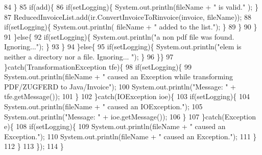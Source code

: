 \begin{DoxyCode}
84                             \}
85                             \textcolor{keywordflow}{if}(add)\{
86                                 \textcolor{keywordflow}{if}(setLogging)\{ System.out.println(fileName + \textcolor{stringliteral}{" is valid."} ); \}
87                                 ReducedInvoiceList.add(ir.ConvertInvoiceToRinvoice(invoice, fileName));
88                                 \textcolor{keywordflow}{if}(setLogging)\{ System.out.println( fileName + \textcolor{stringliteral}{" added to the list."}); \}
89                             \}
90                         \}
91                     \}\textcolor{keywordflow}{else}\{
92                         \textcolor{keywordflow}{if}(setLogging)\{ System.out.println(\textcolor{stringliteral}{"a non pdf file was found. Ignoring..."}); \}
93                     \}
94                 \}\textcolor{keywordflow}{else}\{
95                     \textcolor{keywordflow}{if}(setLogging)\{ System.out.println(\textcolor{stringliteral}{"elem is neither a directory nor a file. Ignoring...
      "}); \}
96                 \}\}
97             \}\textcolor{keywordflow}{catch}(TransformationException tfe)\{
98                 \textcolor{keywordflow}{if}(setLogging)\{ 
99                     System.out.println(fileName + \textcolor{stringliteral}{" caused an Exception while transforming PDF/ZUGFERD to
       Java/Invoice"});
100                     System.out.println(\textcolor{stringliteral}{"Message: "} + tfe.getMessage());
101                 \}
102             \}\textcolor{keywordflow}{catch}(IOException ioe)\{
103                 \textcolor{keywordflow}{if}(setLogging)\{ 
104                     System.out.println(fileName + \textcolor{stringliteral}{" caused an IOException."});
105                     System.out.println(\textcolor{stringliteral}{"Message: "} + ioe.getMessage());
106                 \}
107             \}\textcolor{keywordflow}{catch}(Exception e)\{
108                 \textcolor{keywordflow}{if}(setLogging)\{ 
109                     System.out.println(fileName + \textcolor{stringliteral}{" caused an Exception."});
110                     System.out.println(fileName + \textcolor{stringliteral}{" caused an Exception."});
111                 \}
112             \}
113         \});
114     \}
\end{DoxyCode}
